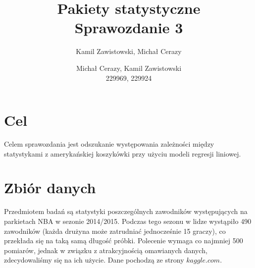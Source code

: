 \documentclass[11pt,a4paper]{article}
\author{Kamil Zawistowski, Michał Cerazy}
\begin{document}
\title{Pakiety statystyczne \\ Sprawozdanie 3}
\author{Michał Cerazy, Kamil Zawistowski \\ 229969, 229924}
\maketitle
\newpage
\tableofcontents
\newpage
\section{Cel}
Celem sprawozdania jest odszukanie występowania zależności między statystykami z amerykańskiej koszykówki przy użyciu modeli regresji liniowej. 

\section{Zbiór danych}
Przedmiotem badań są statystyki poszczególnych zawodników występujących na parkietach NBA w sezonie 2014/2015. Podczas tego sezonu w lidze wystąpiło 490 zawodników (każda drużyna może zatrudniać jednocześnie 15 graczy), co przekłada się na taką samą długość próbki. Polecenie wymaga co najmniej 500 pomiarów, jednak w związku z atrakcyjnością omawianych danych, zdecydowaliśmy się na ich użycie. Dane pochodzą ze strony $kaggle.com$. 
\end{document}
